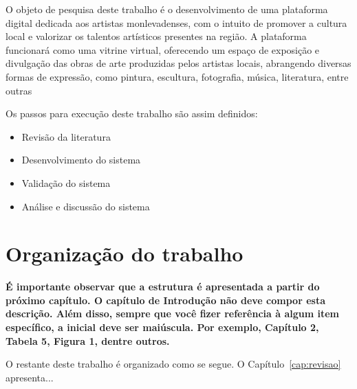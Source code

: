 O objeto de pesquisa deste trabalho é o desenvolvimento de uma plataforma digital dedicada aos artistas monlevadenses, com o intuito de promover a cultura local e valorizar os talentos artísticos presentes na região. A plataforma funcionará como uma vitrine virtual, oferecendo um espaço de exposição e divulgação das obras de arte produzidas pelos artistas locais, abrangendo diversas formas de expressão, como pintura, escultura, fotografia, música, literatura, entre outras

Os passos para execução deste trabalho são assim definidos:

\begin{itemize}
	\item Revisão da literatura
	\item Desenvolvimento do sistema
	\item Validação do sistema
	\item Análise e discussão do sistema
\end{itemize}

\section{Organização do trabalho}

\textbf{É importante observar que a estrutura é apresentada a partir do próximo capítulo. O capítulo de Introdução não deve compor esta descrição. Além disso, sempre que você fizer referência à algum item específico, a inicial deve ser maiúscula. Por exemplo, Capítulo 2, Tabela 5, Figura 1, dentre outros.}

O restante deste trabalho é organizado como se segue. O Capítulo~\ref{cap:revisao} apresenta...
